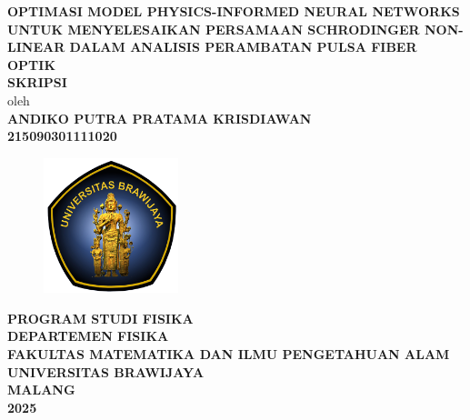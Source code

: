 \pagestyle{empty}
\begin{center}
	{\textbf{OPTIMASI MODEL PHYSICS-INFORMED NEURAL NETWORKS UNTUK MENYELESAIKAN PERSAMAAN SCHRODINGER NON-LINEAR DALAM ANALISIS PERAMBATAN PULSA FIBER OPTIK}}\\
	\vspace{2.0cm}
	{\textbf{SKRIPSI{\huge}}}\\
	\vspace{1.0cm}
	oleh\\
	\textbf{ANDIKO PUTRA PRATAMA KRISDIAWAN}\\
	\textbf{215090301111020}\\
	
	\vspace{1.5cm}
	\begin{figure}[h]
		\centering
		\includegraphics[width=0.35\textwidth]{Gambar/LogoUB.png}
	\end{figure}
	
	\vfill
	{\textbf{PROGRAM STUDI FISIKA}}\\
	{\textbf{DEPARTEMEN FISIKA}}\\
	{\fontsize{10.5pt}{0.ex} \textbf{FAKULTAS MATEMATIKA DAN ILMU PENGETAHUAN ALAM} }\\
	{\textbf{UNIVERSITAS BRAWIJAYA}}\\
	{\textbf{MALANG}}\\
	{\textbf{2025}}\\
\end{center}
\cleardoublepage